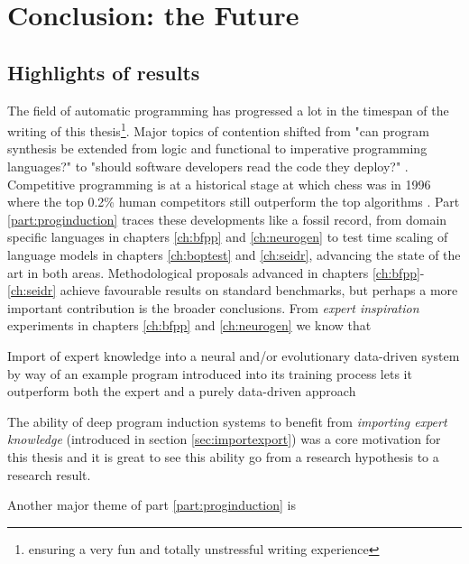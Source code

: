 \chapter{Conclusion: the Future}
\label{ch:conclusion}
\newcommand{\prevchap}{\fpeval{\getrefnumber{ch:conclusion} - 1}}

\section{Highlights of results}

The field of automatic programming has progressed a lot in the timespan of the writing of this thesis\footnote{ensuring a very fun and totally unstressful writing experience}.
Major topics of contention shifted from "can program synthesis be extended from logic and functional to imperative programming languages?" \cite{polikarpovaStructuringSynthesisHeapmanipulating2019} to "should software developers read the code they deploy?" \cite{andrejkarpathy[@karpathy]TheresNewKind2025}.
Competitive programming is at a historical stage at which chess was in 1996 \cite{pandolfiniKasparovDeepBlue1997} where the top 0.2\% human competitors still outperform the top algorithms \cite{openaiCompetitiveProgrammingLarge2025}.
Part \ref{part:proginduction} traces these developments like a fossil record, from domain specific languages in chapters \ref{ch:bfpp} and \ref{ch:neurogen} to test time scaling of language models in chapters \ref{ch:boptest} and \ref{ch:seidr}, advancing the state of the art in both areas.
Methodological proposals advanced in chapters \ref{ch:bfpp}-\ref{ch:seidr} achieve favourable results on standard benchmarks, but perhaps a more important contribution is the broader conclusions.
From \emph{expert inspiration} experiments in chapters \ref{ch:bfpp} and \ref{ch:neurogen} we know that

\begin{highlight}
Import of expert knowledge into a neural and/or evolutionary data-driven system by way of an example program introduced into its training process lets it outperform both the expert and a purely data-driven approach
\end{highlight}

The ability of deep program induction systems to benefit from \emph{importing expert knowledge} (introduced in section \ref{sec:importexport}) was a core motivation for this thesis and it is great to see this ability go from a research hypothesis to a research result.

Another major theme of part \ref{part:proginduction} is

